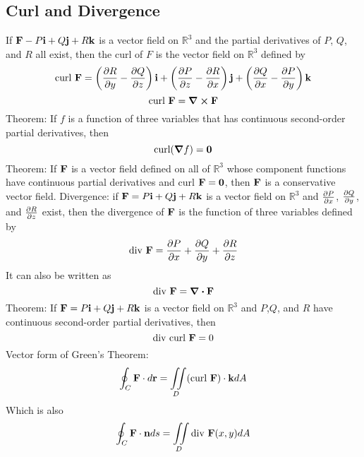 \documentclass{article}
\begin{document}
    \subsection{Curl and Divergence}
    \begin{outline}
        \1 If \(\vb F-P\vb i+Q\vb j+R\vb k\) is a vector field on \(\mathbb R^3\) and the partial derivatives of $P$, $Q$, and $R$ all exist, then the curl of $F$ is the vector field on \(\mathbb R^3\) defined by \[\text{curl }\vb F=\left(\pdv{R}{y}-\pdv{Q}{z}\right)\vb i+\left(\pdv{P}{z}-\pdv{R}{x}\right)\vb j+\left(\pdv{Q}{x}-\pdv{P}{y}\right)\vb k\] 
        \1 \[\text{curl }\vb F=\curl\vb F\]
        \1 Theorem: If $f$ is a function of three variables that has continuous second-order partial derivatives, then \[\text{curl}(\grad f)=\vb 0\]
        \1 Theorem: If \(\vb F\) is a vector field defined on all of \(\mathbb R^3\) whose component functions have continuous partial derivatives and curl \(\vb F=\vb 0\), then \(\vb F\) is a conservative vector field. 
        \1 Divergence: if \(\vb F=P\vb i+Q\vb j+R\vb k\) is a vector field on \(\mathbb R^3\) and \(\pdv{P}{x}\), \(\pdv{Q}{y}\), and \(\pdv{R}{z}\) exist, then the divergence of \(\vb F\) is the function of three variables defined by \[\text{div }\vb F=\pdv{P}{x}+\pdv{Q}{y}+\pdv{R}{z}\] It can also be written as \[\text{div }\vb F=\div \vb F\]
        \1 Theorem: If \(\vb F=P\vb i+Q\vb j+R\vb k\) is a vector field on \(\mathbb R^3\) and \(P\),\(Q\), and \(R\) have continuous second-order partial derivatives, then \[\text{div curl }\vb F=0\]
        \1 Vector form of Green's Theorem: \[\oint_C\vb F\cdot d\vb r=\iint\limits_D(\text{curl }\vb F)\cdot\vb kdA\]
        \1 Which is also \[\oint_C\vb F\cdot\vb nds=\iint\limits_D\text{div }\vb F(x,y)dA\]

    \end{outline}
\end{document}
